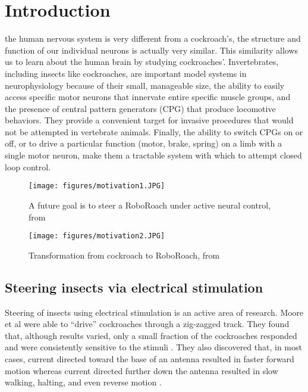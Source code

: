 \documentclass[twocolumn,10pt]{IEEEtran}
\begin{document}
\section{Introduction}
\label{sec:intro}

 the human nervous system is very different from a cockroach’s, the structure and function of our individual neurons is actually very similar. This similarity allows us to learn about the human brain by studying cockroaches'. Invertebrates, including insects like cockroaches, are important model systems in neurophysiology because of their small, manageable size, the ability to easily access specific motor neurons that innervate entire specific muscle groups, and the presence of central pattern generators (CPG) that produce locomotive behaviors. They provide a convenient target for invasive procedures that would not be attempted in vertebrate animals. Finally, the ability to switch CPGs on or off, or to drive a particular function (motor, brake, spring) on a limb with a single motor neuron, make them a tractable system with which to attempt closed loop control. 

\begin{figure}[ht!]
\centering
\texttt{[image: figures/motivation1.JPG]}
\caption{A future goal is to steer a RoboRoach under active neural control, from \cite{whitmire2013kinect}}
\label{fig:motivation1}
\end{figure}

\begin{figure}[ht!]
\centering
\texttt{[image: figures/motivation2.JPG]}
\caption{Transformation from cockroach to RoboRoach, from \cite{backyardbrains2020roboroach}}
\label{fig:motivation2}
\end{figure}


\subsection{Steering insects via electrical stimulation}
Steering of insects using electrical stimulation is an active area of research. Moore et al \cite{moore1998directed} were able to ``drive'' cockroaches through a zig-zagged track. They found that, although results varied, only a small fraction of the cockroaches responded and were consistently sensitive to the stimuli \cite{moore1998directed}. They also discovered that, in most cases, current directed toward the base of an antenna resulted in faster forward motion whereas current directed further down the antenna resulted in slow walking, halting, and even reverse motion \cite{moore1998directed}.
\end{document}
